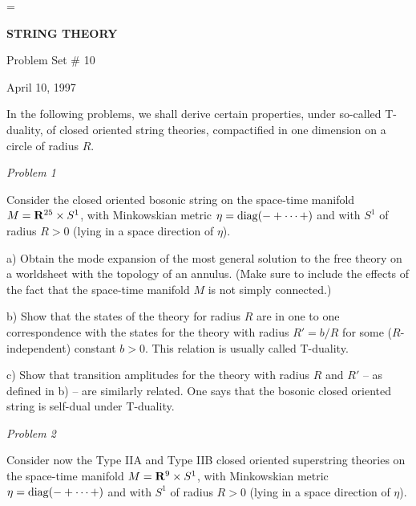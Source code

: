 



\magnification=
\overfullrule=0pt
\baselineskip=17pt
\def\det{{\rm det}}
\def\Det{{\rm Det}}
\def\tr{{\rm tr}}
\def\Tr{{\rm Tr}}
\def\12{{1 \over 2}}
\def\ker{{\rm Ker}}
\def\O{{\cal O}}
\def\G{{\cal G}}

\centerline{{\bf STRING THEORY}}
\centerline{ Problem Set \# 10}
\centerline{April 10, 1997}

\bigskip
\bigskip

In the following problems, we shall derive certain properties, under
so-called T-duality, of closed oriented string theories, compactified
in one dimension on a circle of radius $R$. 
 
\medskip
 
\noindent
{\it Problem 1}

\medskip

Consider the closed oriented bosonic string on the space-time 
manifold $M= {\bf R}^{25} \times S^1$,
with Minkowskian metric $\eta = {\rm diag } (-+ \cdots +)$ and
with $S^1$ of radius $R >0$ (lying in a space direction of $\eta$). 

a) Obtain the mode expansion of the most general solution to the free theory
on a worldsheet with the topology of an annulus. (Make sure to include the 
effects of the fact that the space-time manifold $M$ is not simply connected.)

b)  Show that the states of the theory for radius $R$ are in one
to one correspondence with 
the states for the theory with radius $R'=b/R$ for some ($R$-independent)
constant $b>0$. This relation is usually called T-duality.

c) Show that transition amplitudes for the theory with radius $R$
and $R'$ -- as defined in b) -- are similarly related. One says that
the bosonic closed oriented string is self-dual under T-duality. 


\bigskip

\noindent
{\it Problem 2}

\medskip

Consider now the Type IIA and Type IIB closed oriented superstring
theories on the space-time manifold $M= {\bf R}^{9} \times S^1$,
with Minkowskian metric $\eta = {\rm diag } (-+ \cdots +)$ and
with $S^1$ of radius $R >0$ (lying in a space direction of $\eta$).


